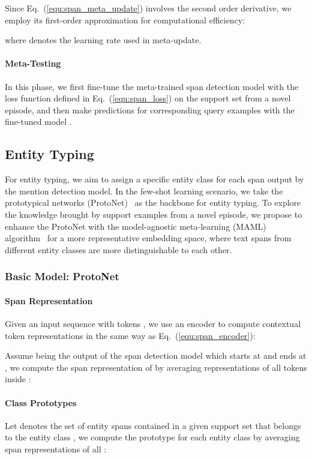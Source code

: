 \documentclass[11pt]{article}
\begin{document}
Since Eq.~(\ref{equ:span_meta_update}) involves the second order derivative, we employ its first-order approximation for computational efficiency:

where  denotes the learning rate used in meta-update.

\paragraph{Meta-Testing}
In this phase, we first fine-tune the meta-trained span detection model  with the loss function defined in Eq.~(\ref{equ:span_loss}) on the support set  from a novel episode, and then make predictions for corresponding query examples  with the fine-tuned model  .


\subsection{Entity Typing}
For entity typing, we aim to assign a specific entity class for each span output by the mention detection model.
In the few-shot learning scenario, we take the prototypical networks (ProtoNet)~\citep{snell2017proto} as the backbone for entity typing.
To explore the knowledge brought by support examples from a novel episode, we propose to enhance the ProtoNet with the model-agnostic meta-learning (MAML) algorithm~\citep{finn2017model} for a more representative embedding space, where
text spans from different entity classes are more distinguishable to each other.

\subsubsection{Basic Model: ProtoNet}
\paragraph{Span Representation}
Given an input sequence with  tokens , we use an encoder  to compute contextual token representations  in the same way as Eq.~(\ref{equ:span_encoder}):


Assume  being the output of the span detection model which starts at  and ends at , we compute the span representation of  by averaging representations of all tokens inside :


\paragraph{Class Prototypes}
Let  denotes the set of entity spans contained in a given support set  that belongs to the entity class ,
we compute the prototype  for each entity class  by averaging span representations of all :
\end{document}
